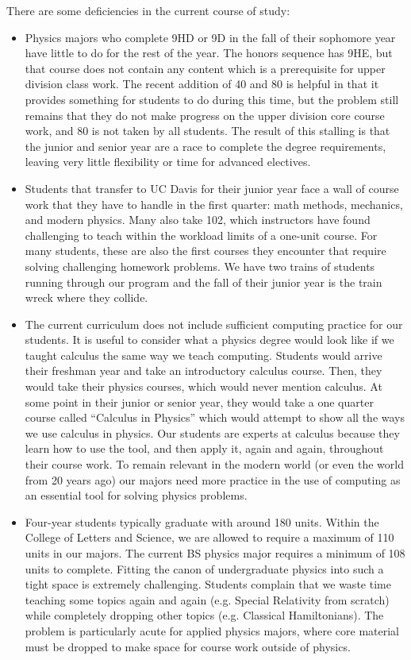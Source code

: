 \documentclass[12pt]{article}
\begin{document}
There are some deficiencies in the current course of study:
\begin{itemize}

\item Physics majors who complete 9HD or 9D in the fall of their
  sophomore year have little to do for the rest of the year.  The
  honors sequence has 9HE, but that course does not contain any
  content which is a prerequisite for upper division class work.  The
  recent addition of 40 and 80 is helpful in that it provides
  something for students to do during this time, but the problem still
  remains that they do not make progress on the upper division core
  course work, and 80 is not taken by all students.  The result of
  this stalling is that the junior and senior year are a race to
  complete the degree requirements, leaving very little flexibility or
  time for advanced electives.

\item Students that transfer to UC Davis for their junior year face a
  wall of course work that they have to handle in the first quarter:
  math methods, mechanics, and modern physics.  Many also take 102,
  which instructors have found challenging to teach within the
  workload limits of a one-unit course.  For many students, these are
  also the first courses they encounter that require solving
  challenging homework problems.  We have two trains of students
  running through our program and the fall of their junior year is the
  train wreck where they collide.

\item The current curriculum does not include sufficient computing
  practice for our students.  It is useful to consider what a physics
  degree would look like if we taught calculus the same way we teach
  computing.  Students would arrive their freshman year and take an
  introductory calculus course.  Then, they would take their physics
  courses, which would never mention calculus.  At some point in their
  junior or senior year, they would take a one quarter course called
  ``Calculus in Physics'' which would attempt to show all the ways we
  use calculus in physics.  Our students are experts at calculus
  because they learn how to use the tool, and then apply it, again and
  again, throughout their course work.  To remain relevant in the
  modern world (or even the world from 20 years ago) our majors need
  more practice in the use of computing as an essential tool for
  solving physics problems.

\item Four-year students typically graduate with around 180 units.
  Within the College of Letters and Science, we are allowed to require
  a maximum of 110 units in our majors.  The current BS physics major
  requires a minimum of 108 units to complete.  Fitting the canon of
  undergraduate physics into such a tight space is extremely
  challenging.  Students complain that we waste time teaching some
  topics again and again (e.g. Special Relativity from scratch) while
  completely dropping other topics (e.g. Classical Hamiltonians).  The
  problem is particularly acute for applied physics majors, where core
  material must be dropped to make space for course work outside of
  physics.


\end{itemize}
\end{document}
